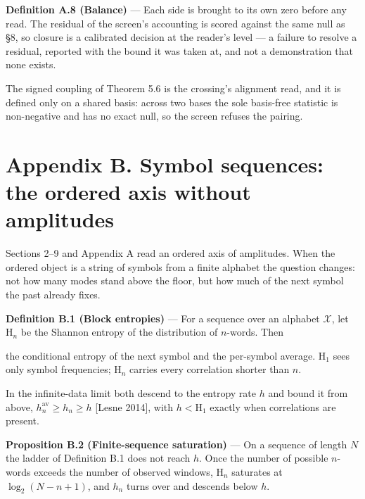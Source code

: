 \documentclass[10pt,letterpaper,twocolumn]{article}
\begin{document}
\textbf{Definition A.8 (Balance)} --- Each side is brought to its own zero before any read. The residual of the screen's accounting is scored against the same null as §8, so closure is a calibrated decision at the reader's level --- a failure to resolve a residual, reported with the bound it was taken at, and not a demonstration that none exists.

The signed coupling of Theorem 5.6 is the crossing's alignment read, and it is defined only on a shared basis: across two bases the sole basis-free statistic is non-negative and has no exact null, so the screen refuses the pairing.

\section{Appendix B. Symbol sequences: the ordered axis without amplitudes}\label{appendix-b-symbol-sequences-the-ordered-axis-without-amplitudes}

Sections 2--9 and Appendix A read an ordered axis of amplitudes. When the ordered object is a string of symbols from a finite alphabet the question changes: not how many modes stand above the floor, but how much of the next symbol the past already fixes.

\textbf{Definition B.1 (Block entropies)} --- For a sequence over an alphabet \(\mathcal X\), let \(\mathrm H_n\) be the Shannon entropy of the distribution of \(n\)-words. Then


the conditional entropy of the next symbol and the per-symbol average. \(\mathrm H_1\) sees only symbol frequencies; \(\mathrm H_n\) carries every correlation shorter than \(n\).

In the infinite-data limit both descend to the entropy rate \(h\) and bound it from above, \(h_n^{\mathrm{av}}\ge h_n\ge h\) {[}Lesne 2014{]}, with \(h<\mathrm H_1\) exactly when correlations are present.

\textbf{Proposition B.2 (Finite-sequence saturation)} --- On a sequence of length \(N\) the ladder of Definition B.1 does not reach \(h\). Once the number of possible \(n\)-words exceeds the number of observed windows, \(\mathrm H_n\) saturates at \(\log_2(N-n+1)\), and \(h_n\) turns over and descends below \(h\).
\end{document}
